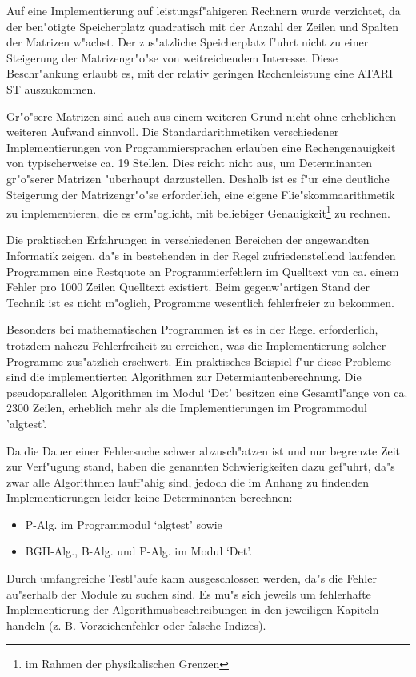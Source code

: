 Auf eine Implementierung auf leistungsf"ahigeren Rechnern wurde verzichtet,
da der ben"otigte Speicherplatz quadratisch mit der Anzahl der Zeilen und
Spalten der Matrizen w"achst. Der zus"atzliche Speicherplatz f"uhrt nicht
zu einer Steigerung der Matrizengr"o"se von weitreichendem Interesse.
Diese Beschr"ankung erlaubt es, mit der relativ geringen Rechenleistung
eine ATARI ST auszukommen.

Gr"o"sere Matrizen sind auch aus einem weiteren Grund nicht ohne
erheblichen weiteren Aufwand sinnvoll. Die Standardarithmetiken
verschiedener Implementierungen von Programmiersprachen erlauben eine
Rechengenauigkeit von typischerweise ca. 19 Stellen. Dies reicht nicht
aus, um Determinanten
gr"o"serer Matrizen "uberhaupt darzustellen. Deshalb ist es f"ur eine
deutliche Steigerung der Matrizengr"o"se erforderlich, eine eigene
Flie"skommaarithmetik zu implementieren, die es erm"oglicht, mit
beliebiger Genauigkeit\footnote{im Rahmen der physikalischen Grenzen}
zu rechnen.

Die praktischen Erfahrungen in verschiedenen Bereichen der angewandten
Informatik zeigen, da"s in bestehenden in der Regel zufriedenstellend
laufenden Programmen eine Restquote an Programmierfehlern im
Quelltext von ca. einem Fehler pro 1000 Zeilen Quelltext existiert.
Beim gegenw"artigen Stand der Technik ist es nicht m"oglich, Programme
wesentlich fehlerfreier zu bekommen.

Besonders bei mathematischen Programmen ist es in der Regel erforderlich,
trotzdem nahezu Fehlerfreiheit zu erreichen, was die Implementierung
solcher Programme zus"atzlich erschwert. Ein praktisches Beispiel
f"ur diese Probleme sind die implementierten Algorithmen zur
Determiantenberechnung. Die pseudoparallelen Algorithmen im Modul
`Det' besitzen eine Gesamtl"ange von ca. 2300 Zeilen, erheblich mehr
als die Implementierungen im Programmodul 'algtest'.

Da die Dauer einer Fehlersuche schwer abzusch"atzen ist und nur begrenzte
Zeit zur Verf"ugung stand, haben die genannten Schwierigkeiten dazu
gef"uhrt, da"s zwar alle Algorithmen lauff"ahig sind, jedoch
die im Anhang zu findenden Implementierungen leider keine
Determinanten berechnen:
\begin{itemize}
\item P-Alg. im Programmodul `algtest' sowie
\item BGH-Alg., B-Alg. und P-Alg. im Modul `Det'.
\end{itemize}
Durch umfangreiche Testl"aufe kann ausgeschlossen werden, da"s die Fehler
au"serhalb der Module zu suchen sind. Es mu"s sich jeweils um fehlerhafte
Implementierung der Algorithmusbeschreibungen in den jeweiligen Kapiteln
handeln (z. B. Vorzeichenfehler oder falsche Indizes).

